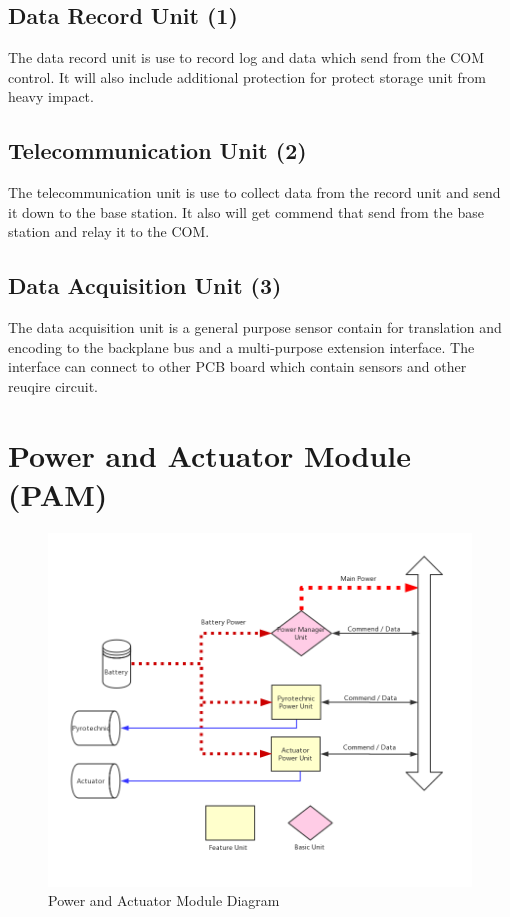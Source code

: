 \documentclass[12pt,article]{memoir}
\begin{document}
\subsection{Data Record Unit (1)}
The data record unit is use to record log and data which send from the COM control. It will also include additional protection for protect storage unit from heavy impact.
\subsection{Telecommunication Unit (2)}
The telecommunication unit is use to collect data from the record unit and send it down to the base station. It also will get commend that send from the base station and relay it to the COM.
\subsection{Data Acquisition Unit (3)}
The data acquisition unit is a general purpose sensor contain for translation and encoding to the backplane bus and a multi-purpose extension interface. The interface can connect to other PCB board which contain sensors and other reuqire circuit.
\clearpage
\section{Power and Actuator Module (PAM)}
\begin{figure}[h]
\includegraphics[width=\textwidth]{img/ES00003_PAMdia.png}
 \caption{Power and Actuator Module Diagram}	
\end{figure}
\end{document}
